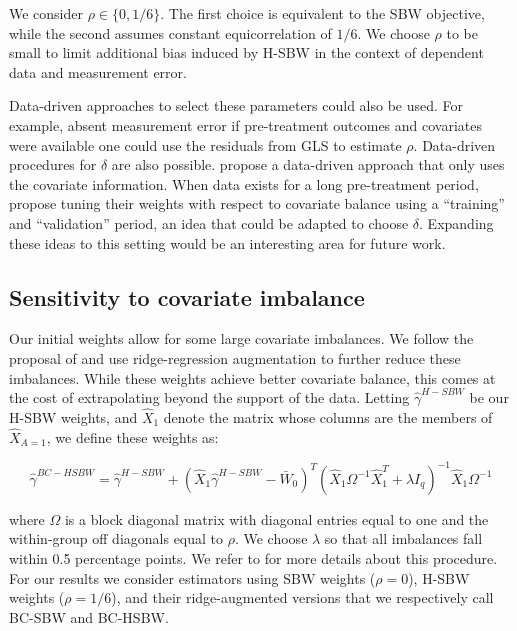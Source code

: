 \documentclass[aoas]{imsart}
\theoremstyle{plain}
\theoremstyle{remark}
\begin{document}
We consider $\rho \in \{0, 1/6\}$. The first choice is equivalent to the SBW objective, while the second assumes constant equicorrelation of $1/6$. We choose $\rho$ to be small to limit additional bias induced by H-SBW in the context of dependent data and measurement error.

Data-driven approaches to select these parameters could also be used. For example, absent measurement error if pre-treatment outcomes and covariates were available one could use the residuals from GLS to estimate $\rho$. Data-driven procedures for $\delta$ are also possible. \cite{wang2020minimal} propose a data-driven approach that only uses the covariate information. When data exists for a long pre-treatment period, \cite{abadie2015comparative} propose tuning their weights with respect to covariate balance using a ``training'' and ``validation'' period, an idea that could be adapted to choose $\delta$. Expanding these ideas to this setting would be an interesting area for future work.

\subsection{Sensitivity to covariate imbalance}

Our initial weights allow for some large covariate imbalances. We follow the proposal of \cite{ben2021augmented} and use ridge-regression augmentation to further reduce these imbalances. While these weights achieve better covariate balance, this comes at the cost of extrapolating beyond the support of the data. Letting $\hat{\gamma}^{H-SBW}$ be our H-SBW weights, and $\hat{X}_1$ denote the matrix whose columns are the members of $\hat{X}_{A=1}$, we define these weights as:

\begin{equation}
\hat{\gamma}^{BC-HSBW} = \hat{\gamma}^{H-SBW} + (\hat{X}_1\hat{\gamma}^{H-SBW} - \bar{W}_0)^T(\hat{X}_1\Omega^{-1}\hat{X}_1^T + \lambda I_q)^{-1}\hat{X}_1\Omega^{-1}
\end{equation}

%
where $\Omega$ is a block diagonal matrix with diagonal entries equal to one and the within-group off diagonals equal to $\rho$. We choose $\lambda$ so that all imbalances fall within 0.5 percentage points. We refer to \cite{ben2021augmented} for more details about this procedure. For our results we consider estimators using SBW weights ($\rho = 0$), H-SBW weights ($\rho = 1/6$), and their ridge-augmented versions that we respectively call BC-SBW and BC-HSBW.
\end{document}
